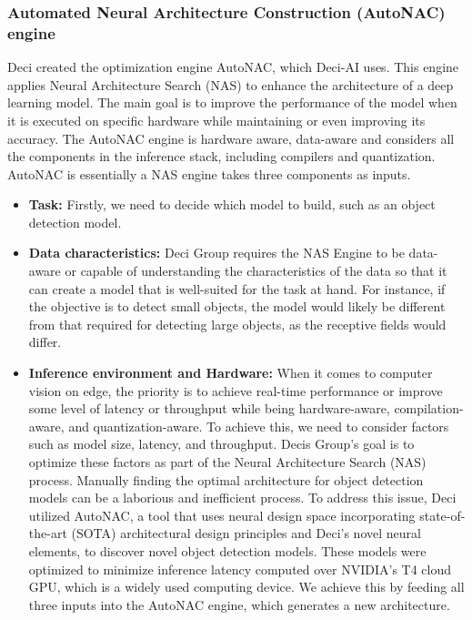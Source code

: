 \subsubsection{Automated Neural Architecture Construction (AutoNAC) engine}
Deci created the optimization engine AutoNAC, which Deci-AI uses. This engine applies Neural Architecture Search (NAS) to enhance the architecture of a deep learning model. The main goal is to improve the performance of the model when it is executed on specific hardware while maintaining or even improving its accuracy. The AutoNAC engine is hardware aware, data-aware and considers all the components in the inference stack, including compilers and quantization. \\
AutoNAC is essentially a NAS engine takes three components as inputs. \cite{yolo-nas-webinar}
\begin{itemize}
    \item \textbf{Task: } Firstly, we need to decide which model to build, such as an object detection model.\\
    \item \textbf{Data characteristics: } Deci Group requires the NAS Engine to be data-aware or capable of understanding the characteristics of the data so that it can create a model that is well-suited for the task at hand. For instance, if the objective is to detect small objects, the model would likely be different from that required for detecting large objects, as the receptive fields would differ. \\
    \item \textbf{Inference environment and Hardware: } When it comes to computer vision on edge, the priority is to achieve real-time performance or improve some level of latency or throughput while being hardware-aware, compilation-aware, and quantization-aware. To achieve this, we need to consider factors such as model size, latency, and throughput. Decis Group's goal is to optimize these factors as part of the Neural Architecture Search (NAS) process. Manually finding the optimal architecture for object detection models can be a laborious and inefficient process. To address this issue, Deci utilized AutoNAC, a tool that uses neural design space incorporating state-of-the-art (SOTA) architectural design principles and Deci's novel neural elements, to discover novel object detection models. These models were optimized to minimize inference latency computed over NVIDIA's T4 cloud GPU, which is a widely used computing device. We achieve this by feeding all three inputs into the AutoNAC engine, which generates a new architecture.
\end{itemize}
 
